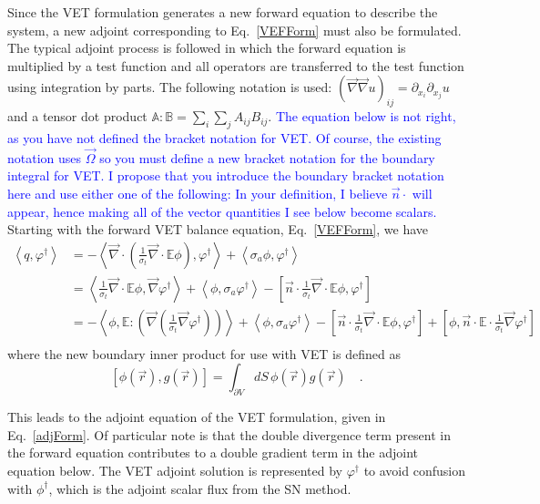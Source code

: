 \documentclass[12pt]{report}
\newcommand{\vr}{\vec{r}}
\newcommand{\vO}{\vec{\Omega}}
\newcommand{\bra}{\left\langle}
\newcommand{\ket}{\right\rangle}
\newcommand{\sbra}{\left[}
\newcommand{\sket}{\right]}
\renewcommand{\div}{\vec{\nabla} \cdot}
\newcommand{\grad}{\vec{\nabla}}
\newcommand{\vefadj}{\varphi^\dag}
\newcommand{\vn}{\vec{n}}
\newcommand{\Edd}{\mathbb{E}}
\newcommand{\sigt}{\sigma_t}
\newcommand{\siga}{\sigma_a}
\newcommand{\scalSource}{q}
\newcommand{\comment}[2]{\marginpar{\textcolor{#2}{$\star$}}\textcolor{#2}{#1}\newline}
\newcommand{\jcr}[1]{\comment{#1}{blue}}
\newcommand{\jcr}[1]{\phantom{a}}
\begin{document}
Since the VET formulation generates a new forward equation to describe the system, a new adjoint corresponding to Eq.~\eqref{VEFForm} must also be formulated. The typical adjoint process is followed in which the forward equation is multiplied by a test function and all operators are transferred to the test function using integration by parts. The following notation is used: $(\grad \grad u)_{ij} = \partial_{x_i} \partial_{x_j} u$
and a tensor dot product $\mathbb{A} : \mathbb{B} = \sum_i \sum_j A_{ij}B_{ij}$.
\jcr{
The equation below is not right, as you have not defined the bracket notation for VET. Of course, the existing notation uses $\vO$ so you must define a new bracket notation for the boundary integral for VET. I  propose that you introduce the boundary bracket notation here and use either one of the following:
In your definition, I believe $\vn \cdot$ will appear, hence making all of the vector quantities I see below become scalars.}
Starting with the forward VET balance equation, Eq.~\eqref{VEFForm}, we have 
\begin{equation}
\label{VEFadjFormDeriv}
\begin{split}
\bra \scalSource , \vefadj \ket &= - \bra \div \left( \frac{1}{\sigt}\div \Edd \phi \right), \vefadj \ket +  \bra \siga \phi, \vefadj \ket   \\
&= \bra \frac{1}{\sigt}\div \Edd \phi, \grad \vefadj \ket  +  \bra  \phi, \siga \vefadj \ket - \sbra \vn \cdot \frac{1}{\sigt}\div \Edd \phi, \vefadj \sket   \\
 &=  - \bra \phi, \Edd : \left( \grad \left( \frac{1}{\sigt}\grad \vefadj \right) \right) \ket  +  \bra  \phi, \siga \vefadj \ket - \sbra \vn \cdot  \frac{1}{\sigt}\div \Edd \phi, \vefadj \sket + \sbra \phi, \vn \cdot  \Edd \cdot \frac{1}{\sigt} \grad \vefadj \sket \\
\end{split}
\end{equation}
where the new boundary inner product for use with VET is defined as
\begin{equation}
\sbra \phi(\vr) , g(\vr)  \sket = \int_{\partial V} dS \, \phi (\vr) g (\vr)  \quad .
\end{equation}

This leads to the adjoint equation of the VET formulation, given in Eq.~\eqref{adjForm}. Of particular note is that the double divergence term present in the forward equation contributes to a double gradient term in the adjoint equation below. The VET adjoint solution is represented by $\vefadj$ to avoid confusion with $\phi^\dag$, which is the adjoint scalar flux from the SN method. 
\end{document}
